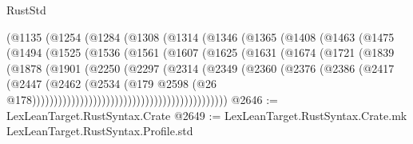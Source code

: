 \begin{lexlean}{RustStd}
\begin{coremodule}
                        (@1135
                          (@1254
                            (@1284
                              (@1308
                                (@1314
                                  (@1346
                                    (@1365
                                      (@1408
                                        (@1463
                                          (@1475
                                            (@1494
                                              (@1525
                                                (@1536
                                                  (@1561
                                                    (@1607
                                                      (@1625
                                                        (@1631
                                                          (@1674
                                                            (@1721
                                                              (@1839
                                                                (@1878
                                                                  (@1901
                                                                    (@2250
                                                                      (@2297
                                                                        (@2314
                                                                          (@2349
                                                                            (@2360
                                                                              (@2376
                                                                                (@2386
                                                                                  (@2417
                                                                                    (@2447
                                                                                      (@2462
                                                                                        (@2534
                                                                                          (@179
                                                                                            @2598
                                                                                            (@26
                                                                                              @178)))))))))))))))))))))))))))))))))))))))))))))
@2646 := LexLeanTarget.RustSyntax.Crate
@2649 := LexLeanTarget.RustSyntax.Crate.mk LexLeanTarget.RustSyntax.Profile.std

\end{coremodule}
\end{lexlean}
